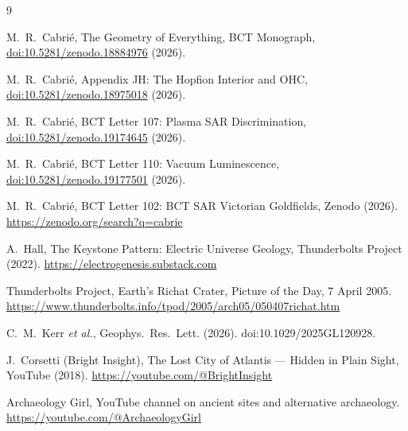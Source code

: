 \documentclass[12pt,twocolumn]{article}
\begin{document}
\begin{thebibliography}{9}

 M.~R.~Cabri\'{e},
The Geometry of Everything, BCT Monograph,
\href{https://doi.org/10.5281/zenodo.18884976}
{doi:10.5281/zenodo.18884976} (2026).

 M.~R.~Cabri\'{e},
Appendix JH: The Hopfion Interior and OHC,
\href{https://doi.org/10.5281/zenodo.18975018}
{doi:10.5281/zenodo.18975018} (2026).

 M.~R.~Cabri\'{e},
BCT Letter 107: Plasma SAR Discrimination,
\href{https://doi.org/10.5281/zenodo.19174645}
{doi:10.5281/zenodo.19174645} (2026).

 M.~R.~Cabri\'{e},
BCT Letter 110: Vacuum Luminescence,
\href{https://doi.org/10.5281/zenodo.19177501}
{doi:10.5281/zenodo.19177501} (2026).

 M.~R.~Cabri\'{e},
BCT Letter 102: BCT SAR Victorian Goldfields,
Zenodo (2026).
\url{https://zenodo.org/search?q=cabrie}

 A.~Hall,
The Keystone Pattern: Electric Universe Geology,
Thunderbolts Project (2022).
\url{https://electrogenesis.substack.com}

 Thunderbolts Project,
Earth's Richat Crater, Picture of the Day,
7 April 2005.
\url{https://www.thunderbolts.info/tpod/2005/arch05/050407richat.htm}

 C.~M.~Kerr \textit{et al.},
Geophys.\ Res.\ Lett. (2026).
doi:10.1029/2025GL120928.

 J.~Corsetti (Bright Insight),
The Lost City of Atlantis --- Hidden in Plain Sight,
YouTube (2018).
\url{https://youtube.com/@BrightInsight}

 Archaeology Girl,
YouTube channel on ancient sites and alternative
archaeology.
\url{https://youtube.com/@ArchaeologyGirl}

\end{thebibliography}
\end{document}
